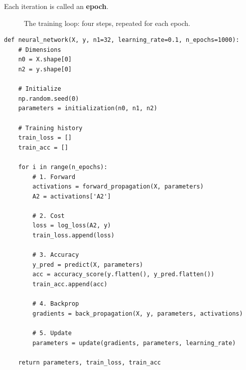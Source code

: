 \documentclass[11pt]{article}
\begin{document}
Each iteration is called an \textbf{epoch}.

\begin{figure}[H]
    \centering
    \caption{The training loop: four steps, repeated for each epoch.}
\end{figure}

\begin{lstlisting}
def neural_network(X, y, n1=32, learning_rate=0.1, n_epochs=1000):
    # Dimensions
    n0 = X.shape[0]
    n2 = y.shape[0]

    # Initialize
    np.random.seed(0)
    parameters = initialization(n0, n1, n2)

    # Training history
    train_loss = []
    train_acc = []

    for i in range(n_epochs):
        # 1. Forward
        activations = forward_propagation(X, parameters)
        A2 = activations['A2']

        # 2. Cost
        loss = log_loss(A2, y)
        train_loss.append(loss)

        # 3. Accuracy
        y_pred = predict(X, parameters)
        acc = accuracy_score(y.flatten(), y_pred.flatten())
        train_acc.append(acc)

        # 4. Backprop
        gradients = back_propagation(X, y, parameters, activations)

        # 5. Update
        parameters = update(gradients, parameters, learning_rate)

    return parameters, train_loss, train_acc
\end{lstlisting}
\end{document}
